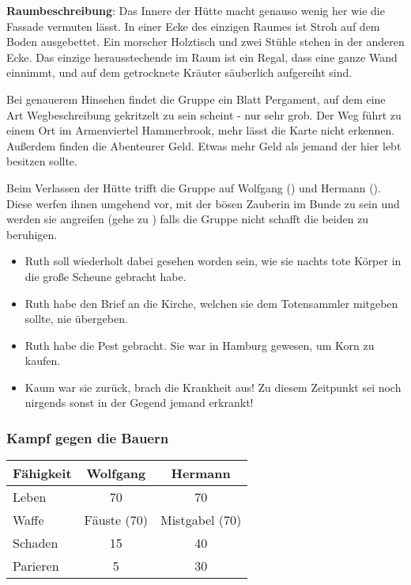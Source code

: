 \textbf{Raumbeschreibung}: Das Innere der Hütte macht genauso wenig her wie die Fassade vermuten lässt. In einer Ecke des einzigen Raumes ist Stroh auf dem Boden ausgebettet. Ein morscher Holztisch und zwei Stühle stehen in der anderen Ecke. Das einzige herausstechende im Raum ist ein Regal, dass eine ganze Wand einnimmt, und auf dem getrocknete Kräuter säuberlich aufgereiht sind.

Bei genauerem Hinsehen findet die Gruppe ein Blatt Pergament, auf dem eine Art Wegbeschreibung gekritzelt zu sein scheint - nur sehr grob. Der Weg führt zu einem Ort im Armenviertel Hammerbrook, mehr lässt die Karte nicht erkennen. Außerdem finden die Abenteurer Geld. Etwas mehr Geld als jemand der hier lebt besitzen sollte.

Beim Verlassen der Hütte trifft die Gruppe auf Wolfgang (\blue{\ref{Wolfgang}}) und Hermann (\blue{\ref{Hermann}}). Diese werfen ihnen umgehend vor, mit der bösen Zauberin im Bunde zu sein und werden sie angreifen (gehe zu \blue{\ref{kampf}}) falls die Gruppe nicht schafft die beiden zu beruhigen.


\begin{itemize}
  \item Ruth soll wiederholt dabei gesehen worden sein, wie sie nachts tote Körper in die große Scheune gebracht habe.
  \item Ruth habe den Brief an die Kirche, welchen sie dem Totensammler mitgeben sollte, nie übergeben.
  \item Ruth habe die Pest gebracht. Sie war in Hamburg gewesen, um Korn zu kaufen.
  \item Kaum war sie zurück, brach die Krankheit aus! Zu diesem Zeitpunkt sei noch nirgends sonst in der Gegend jemand erkrankt!
\end{itemize}

\subsubsection{Kampf gegen die Bauern}
\label{kampf}

\begin{center}
  \begin{tabular}{lcc}

    \toprule
    Fähigkeit & \textbf{Wolfgang} & \textbf{Hermann} \\
    \midrule
    Leben & 70 & 70 \\
    Waffe & Fäuste (70) & Mistgabel (70) \\
    Schaden & 15 & 40 \\
    Parieren & 5 & 30 \\
    \bottomrule
  \end{tabular}
\end{center}



